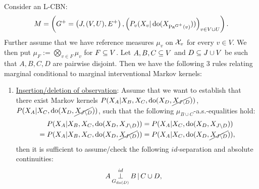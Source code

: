 \begin{Cor}
    \label{cor:as-do-calculus-3}
        Consider an L-CBN:
    \[M= \left ( G^+=\left ( J,(V,U),E^+ \right ), \left ( P_v ( X_v|\operatorname{do}( X_{\mathrm{Pa}^{G^+}(v)})) \right )_{v \in V \cup U} \right ).\]
    Further assume that we have %
    reference measures $\mu_v$ on $\mathcal{X}_v$ for every $v \in V$.
    We then put $\mu_F := \bigotimes_{v \in F} \mu_v$ for $F \subseteq V$.
    Let $A,B,C \subseteq V$ and $D \subseteq J \cup V$ be such that $A,B,C,D$ are pairwise disjoint.
    Then we have the following 3 rules relating marginal conditional to marginal interventional Markov kernels:
    \begin{enumerate}
        \item \underline{Insertion/deletion of observation}:
          Assume that we want to establish 
          that there exist Markov kernels $P(X_A|X_B,X_C,\operatorname{do}(X_{D},\cancel{X_{J\setminus D}}))$, $P(X_A|X_C,\operatorname{do}(X_{D},\cancel{X_{J\setminus D}}))$, 
          such that the following $\mu_{B \cup C}$-a.s.-equalities hold:
            \begin{equation*}\begin{split}
                P(X_A|X_B,X_C,\operatorname{do}(X_{D},X_{J\setminus D})) & = P(X_A|X_C,\operatorname{do}(X_{D},X_{J\setminus D})) \\
              = P(X_A|X_B,X_C,\operatorname{do}(X_{D},\cancel{X_{J\setminus D}})) & = P(X_A|X_C,\operatorname{do}(X_{D},\cancel{X_{J\setminus D}})), 
            \end{split}\end{equation*}
         then it is sufficient to assume/check the following $id$-separation and absolute continuities:
         \begin{align*} 
             A &\idPerp_{G_{\doit(D)}} B \given C \cup D, &

\end{align*}
\end{enumerate}
\end{Cor}
